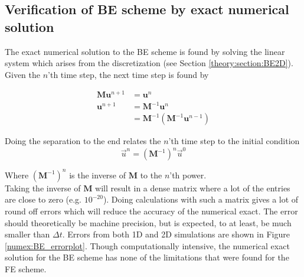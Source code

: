 \subsection{Verification of BE scheme by exact numerical solution}

The exact numerical solution to the BE scheme is found by solving the linear system which arises from the discretization (see Section \ref{theory:section:BE2D}). 
Given the $n$'th time step, the next time step is found by

\begin{align*}
 \mathbf M \mathbf u^{n+1} &= \mathbf{u}^n \\
 \mathbf{u}^{n+1} &= \mathbf{M}^{-1} \mathbf{u}^n \\
 &= \mathbf{M}^{-1}\left(\mathbf{M}^{-1} \mathbf{u}^{n-1}\right)
\end{align*}

\noindent Doing the separation to the end relates the $n$'th time step to the initial condition
\begin{equation}\label{BE_numex}
 \vec u^{n} = \left(\mathbf M^{-1}\right)^{n} \vec u^0
\end{equation}

\noindent Where $\left(\mathbf M^{-1}\right)^{n}$ is the inverse of $\mathbf M$ to the $n$'th power.\\

\noindent Taking the inverse of $\mathbf M$ will result in a dense matrix where a lot of the entries are close to zero (e.g. $10^{-20}$). 
Doing calculations with such a matrix gives a lot of round off errors which will reduce the accuracy of the numerical exact. 
The error should theoretically be machine precision, but is expected, to at least, be much smaller than $\Delta t$. 
Errors from both 1D and 2D simulations are shown in Figure \ref{numex:BE_errorplot}. 
Though computationally intensive, the numerical exact solution for the BE scheme has none of the limitations that were found for the FE scheme. 

